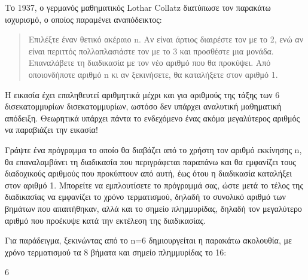 \documentclass[a4paper,11pt,oneside]{book}
\begin{document}
\begin{exercise} %
Το 1937, ο γερμανός μαθηματικός Lothar Collatz διατύπωσε τον παρακάτω ισχυρισμό, ο οποίος παραμένει αναπόδεικτος:
\begin{quote}
Επιλέξτε έναν θετικό ακέραιο n. Αν είναι άρτιος διαιρέστε τον με το 2, ενώ αν είναι περιττός πολλαπλασιάστε τον με το 3 και προσθέστε μια μονάδα. Επαναλάβετε τη διαδικασία με τον νέο αριθμό που θα προκύψει. Από οποιονδήποτε αριθμό n κι αν ξεκινήσετε, θα καταλήξετε στον αριθμό 1.
\end{quote}
Η εικασία %
έχει επαληθευτεί αριθμητικά μέχρι και για αριθμούς της τάξης των 6 δισεκατομμυρίων δισεκατομμυρίων, ωστόσο δεν υπάρχει αναλυτική μαθηματική απόδειξη. Θεωρητικά υπάρχει πάντα το ενδεχόμενο ένας ακόμα μεγαλύτερος αριθμός να παραβιάζει την εικασία!

\clearpage
Γράψτε ένα πρόγραμμα %
%
το οποίο θα διαβάζει από το χρήστη τον αριθμό εκκίνησης n, θα επαναλαμβάνει τη διαδικασία 
που περιγράφεται παραπάνω και θα εμφανίζει τους διαδοχικούς αριθμούς που προκύπτουν από αυτή, έως ότου η διαδικασία καταλήξει στον αριθμό 1. Μπορείτε να εμπλουτίσετε το πρόγραμμά σας, ώστε μετά το τέλος της διαδικασίας να εμφανίζει το χρόνο τερματισμού, δηλαδή το συνολικό αριθμό των βημάτων που απαιτήθηκαν, αλλά και το σημείο πλημμυρίδας, δηλαδή τον μεγαλύτερο αριθμό που προέκυψε κατά την εκτέλεση της διαδικασίας.

\begin{note}
Για παράδειγμα, ξεκινώντας από το n=6 δημιουργείται η παρακάτω ακολουθία, με χρόνο τερματισμού τα 8 βήματα και σημείο πλημμυρίδας το 16:
\begin{center}
6
\end{center}
\end{note}

\end{exercise}



\section*{}
\vspace{-2\parskip}
\hrulefill

\end{document}
